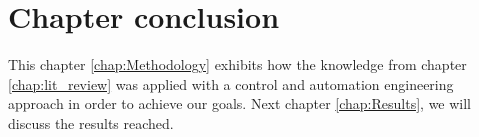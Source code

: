 \section{Chapter conclusion}

This chapter \ref{chap:Methodology} exhibits how the knowledge from chapter \ref{chap:lit_review} was applied with a control and automation engineering approach in order to achieve our goals. 
Next chapter \ref{chap:Results}, we will discuss the results reached.




\clearpage